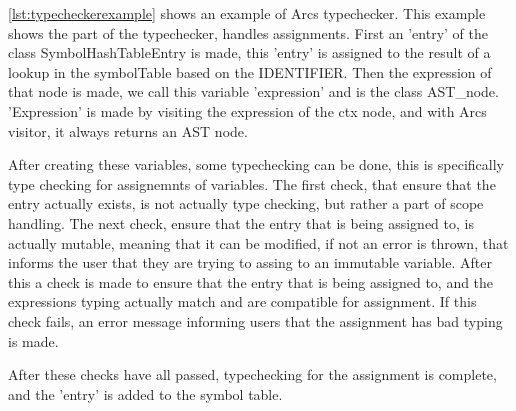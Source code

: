 \ref{lst:typecheckerexample} shows an example of Arcs typechecker. This example shows the part of the typechecker, handles assignments. First an 'entry' of the class SymbolHashTableEntry is made, this 'entry' is assigned to the result of a lookup in the symbolTable based on the IDENTIFIER. Then the expression of that node is made, we call this variable 'expression' and is the class AST\_node. 'Expression' is made by visiting the expression of the ctx node, and with Arcs visitor, it always returns an AST node.

After creating these variables, some typechecking can be done, this is specifically type checking for assignemnts of variables. The first check, that ensure that the entry actually exists, is not actually type checking, but rather a part of scope handling. The next check, ensure that the entry that is being assigned to, is actually mutable, meaning that it can be modified, if not an error is thrown, that informs the user that they are trying to assing to an immutable variable. After this a check is made to ensure that the entry that is being assigned to, and the expressions typing actually match and are compatible for assignment. If this check fails, an error message informing users that the assignment has bad typing is made.

After these checks have all passed, typechecking for the assignment is complete, and the 'entry' is added to the symbol table.



